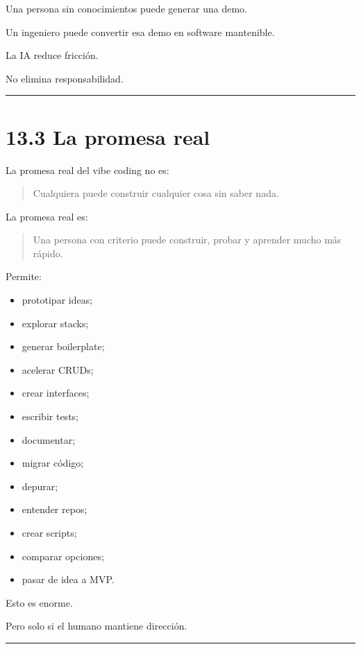 Una persona sin conocimientos puede generar una demo.

Un ingeniero puede convertir esa demo en software mantenible.

La IA reduce fricción.

No elimina responsabilidad.

\begin{center}\rule{0.5\linewidth}{0.5pt}\end{center}

\section{13.3 La promesa real}\label{la-promesa-real}

La promesa real del vibe coding no es:

\begin{quote}
Cualquiera puede construir cualquier cosa sin saber nada.
\end{quote}

La promesa real es:

\begin{quote}
Una persona con criterio puede construir, probar y aprender mucho más
rápido.
\end{quote}

Permite:

\begin{itemize}
\tightlist
\item
  prototipar ideas;
\item
  explorar stacks;
\item
  generar boilerplate;
\item
  acelerar CRUDs;
\item
  crear interfaces;
\item
  escribir tests;
\item
  documentar;
\item
  migrar código;
\item
  depurar;
\item
  entender repos;
\item
  crear scripts;
\item
  comparar opciones;
\item
  pasar de idea a MVP.
\end{itemize}

Esto es enorme.

Pero solo si el humano mantiene dirección.

\begin{center}\rule{0.5\linewidth}{0.5pt}\end{center}


